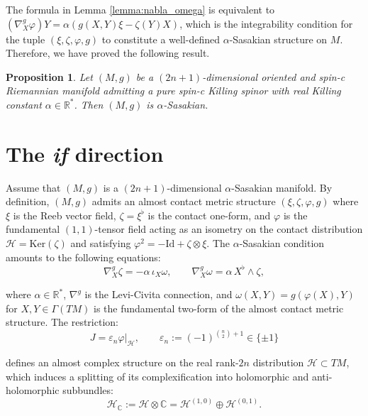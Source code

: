 \documentclass[10pt,a4paper,twoside,reqno]{amsart}
\theoremstyle{plain}
\newtheorem{prop}[thm]{Proposition}
\theoremstyle{definition}
\theoremstyle{remark}
\renewcommand{\ker}{\mathrm{Ker}}
\begin{document}
The formula in Lemma \ref{lemma:nabla_omega} is equivalent to $(\nabla^g_X\varphi)Y=\alpha(g(X,Y)\xi-\zeta(Y)X)$, which is the integrability condition for the tuple $(\xi, \zeta, \varphi, g)$ to constitute a well-defined $\alpha$-Sasakian structure on $M$. Therefore, we have proved the following result.

\begin{prop}
Let $(M,g)$ be a $(2n+1)$-dimensional oriented and spin-c Riemannian manifold admitting a pure spin-c Killing spinor with real Killing constant $\alpha\in\mathbb{R}^{\ast}$. Then $(M,g)$ is $\alpha$-Sasakian.
\end{prop}


\section{The \emph{if} direction}
\label{sec:if}


Assume that $(M,g)$ is a $(2n+1)$-dimensional $\alpha$-Sasakian manifold. By definition, $(M,g)$ admits an almost contact metric structure $(\xi, \zeta, \varphi, g)$ where $\xi$ is the Reeb vector field, $\zeta = \xi^\flat$ is the contact one-form, and $\varphi$ is the fundamental $(1,1)$-tensor field acting as an isometry on the contact distribution $\mathcal{H}  = \ker(\zeta)$ and satisfying $\varphi^2 = -\mathrm{Id} + \zeta \otimes \xi$. The $\alpha$-Sasakian condition amounts to the following equations:
\begin{equation*}
\nabla^g_X \zeta = -\alpha\, \iota_X \omega,\qquad \nabla^g_X \omega = \alpha\, X^\flat \wedge \zeta,
\end{equation*}

\noindent
where $\alpha\in\mathbb{R}^{\ast}$, $\nabla^g$ is the Levi-Civita connection, and $\omega(X,Y) = g(\varphi(X),Y)$ for $X,Y\in\Gamma(TM)$ is the fundamental two-form of the almost contact metric structure. The restriction:
\begin{equation*}
J = \varepsilon_n\varphi\vert_{\mathcal{H}},\qquad \varepsilon_n:=(-1)^{\binom{n}{2}+1}\in\{\pm1\}
\end{equation*}

\noindent
defines an almost complex structure on the real rank-$2n$ distribution $\mathcal{H} \subset TM$, which induces a splitting of its complexification into holomorphic and anti-holomorphic subbundles:
\begin{equation*}
\mathcal{H} _{\mathbb{C}} := \mathcal{H}\otimes \mathbb{C} = \mathcal{H} ^{(1,0)} \oplus \mathcal{H} ^{(0,1)}.
\end{equation*}
\end{document}
